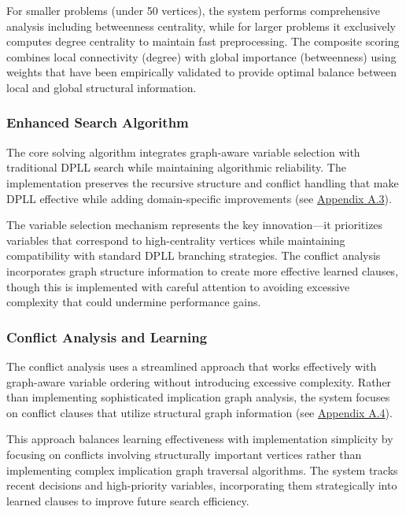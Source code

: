 For smaller problems (under 50 vertices), the system performs comprehensive analysis including betweenness centrality, while for larger problems it exclusively computes degree centrality to maintain fast preprocessing. The composite scoring combines local connectivity (degree) with global importance (betweenness) using weights that have been empirically validated to provide optimal balance between local and global structural information.

\subsubsection{Enhanced Search Algorithm}

The core solving algorithm integrates graph-aware variable selection with traditional DPLL search while maintaining algorithmic reliability. The implementation preserves the recursive structure and conflict handling that make DPLL effective while adding domain-specific improvements (see \hyperref[appendix:graph-aware-search]{Appendix A.3}).

The variable selection mechanism represents the key innovation—it prioritizes variables that correspond to high-centrality vertices while maintaining compatibility with standard DPLL branching strategies. The conflict analysis incorporates graph structure information to create more effective learned clauses, though this is implemented with careful attention to avoiding excessive complexity that could undermine performance gains.

\subsubsection{Conflict Analysis and Learning}

The conflict analysis uses a streamlined approach that works effectively with graph-aware variable ordering without introducing excessive complexity. Rather than implementing sophisticated implication graph analysis, the system focuses on conflict clauses that utilize structural graph information (see \hyperref[appendix:conflict-analysis]{Appendix A.4}).

This approach balances learning effectiveness with implementation simplicity by focusing on conflicts involving structurally important vertices rather than implementing complex implication graph traversal algorithms. The system tracks recent decisions and high-priority variables, incorporating them strategically into learned clauses to improve future search efficiency.

